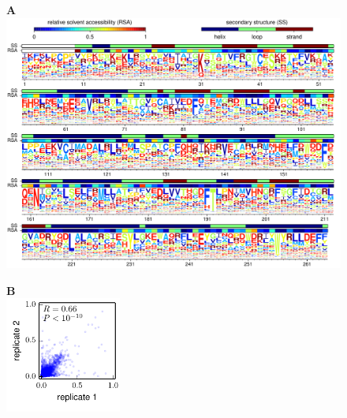 \documentclass[12pt,letterpaper]{article}
\begin{document}
\begin{figure}
\begin{minipage}[t][][t]{5in}
{\bf \Large A} \\
\includegraphics[clip, trim=0 0 0 0.04in,valign=t,width=5in]{../../../examples/Melnikov_et_al_Tn5/prefs_logoplot.pdf}
\end{minipage}
\hspace{0.05in}
\begin{minipage}[t][][t]{1.5in}
{\bf \Large B} \\
\vspace{-0.2in}
\includegraphics[valign=t,width=1.5in]{../../../examples/Melnikov_et_al_Tn5/replicate_pref_corr.pdf}
\end{minipage}
\end{figure}
\end{document}
